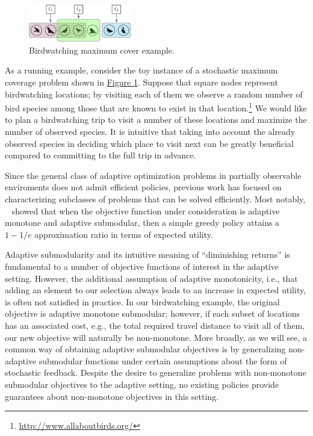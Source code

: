 \documentclass{article}
\newcommand{\figref}[1]{\hyperref[#1]{Figure \ref*{#1}}}
\newcommand{\citet}[1]{\citeauthor{#1}~\shortcite{#1}}
\begin{document}
\begin{figure}[tb]
  \centering
  \includegraphics[width=0.4\textwidth]{figures/birdwatching.pdf}
  \caption{Birdwatching maximum cover example.}\label{fig:toy}
\end{figure}

As a running example, consider the toy instance of a stochastic maximum coverage problem shown in \figref{fig:toy}.
Suppose that square nodes represent birdwatching locations; by visiting each of them we observe a random number of bird species among those that are known to exist in that location.\footnote{\url{http://www.allaboutbirds.org/}}
We would like to plan a birdwatching trip to visit a number of these locations and maximize the number of observed species.
It is intuitive that taking into account the already observed species in deciding which place to visit next can be greatly beneficial compared to committing to the full trip in advance.

Since the general class of adaptive optimization problems in partially observable enviroments does not admit efficient policies, previous work has focused on characterizing subclasses of problems that can be solved efficiently.
Most notably, \citet{golovin11} showed that when the objective function under consideration is adaptive monotone and adaptive submodular, then a simple greedy policy attains a $1-1/e$ approximation ratio in terms of expected utility.

Adaptive submodularity and its intuitive meaning of ``diminishing returns'' is fundamental to a number of objective functions of interest in the adaptive setting.
However, the additional assumption of adaptive monotonicity, i.e., that adding an element to our selection always leads to an increase in expected utility, is often not satisfied in practice.
In our birdwatching example, the original objective is adaptive monotone submodular; however, if each subset of locations has an associated cost, e.g., the total required travel distance to visit all of them, our new objective will naturally be non-monotone.
More broadly, as we will see, a common way of obtaining adaptive submodular objectives is by generalizing non-adaptive submodular functions under certain assumptions about the form of stochastic feedback.
Despite the desire to generalize problems with non-monotone submodular objectives to the adaptive setting, no existing policies provide guarantees about non-monotone objectives in this setting.
\end{document}
